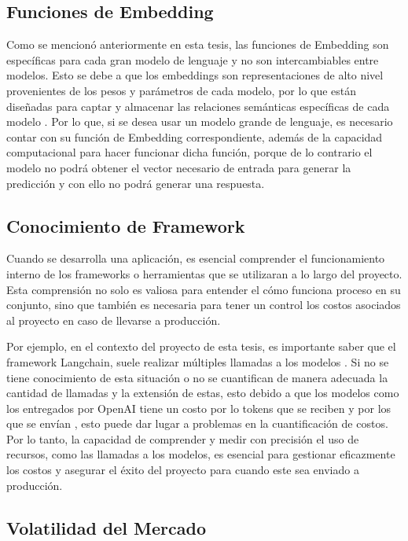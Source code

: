 \subsection{Funciones de Embedding}

Como se mencionó anteriormente en esta tesis, las funciones de Embedding son específicas para cada gran modelo de lenguaje y no son intercambiables entre modelos. Esto se debe a que los embeddings son 
representaciones de alto nivel provenientes de los pesos y parámetros de cada modelo, por lo que están diseñadas para captar y almacenar las relaciones semánticas específicas de cada modelo \cite{microsoft1}. Por lo que, si se desea usar un modelo grande de lenguaje, es necesario contar con su función de Embedding correspondiente, además de la capacidad computacional para hacer funcionar dicha función, porque de lo contrario el modelo no podrá obtener el vector necesario de entrada para generar la predicción y con ello no podrá generar una respuesta. 


\subsection{Conocimiento de Framework}
Cuando se desarrolla una aplicación, es esencial comprender el funcionamiento interno de los frameworks o herramientas que se utilizaran a lo largo del proyecto. 
Esta comprensión no solo es valiosa para entender el cómo funciona proceso en su conjunto, sino que también es necesaria para tener un control los costos asociados al 
proyecto en caso de llevarse a producción.  

Por ejemplo, en el contexto del proyecto de esta tesis, es importante saber que el framework Langchain, suele realizar múltiples llamadas a los modelos \cite{framework1}. Si no se tiene conocimiento de esta situación o no se cuantifican de manera adecuada 
la cantidad de llamadas y la extensión de estas, esto debido a que los modelos como los entregados por OpenAI tiene un costo por lo tokens que se reciben y por los que se envían \cite{openaimodels}, esto puede dar lugar a problemas en la cuantificación de costos. Por lo tanto, la capacidad de comprender y 
medir con precisión el uso de recursos, como las llamadas a los modelos, es esencial para gestionar eficazmente los costos y asegurar el éxito del proyecto para cuando este sea enviado a producción.


\subsection{Volatilidad del Mercado}

